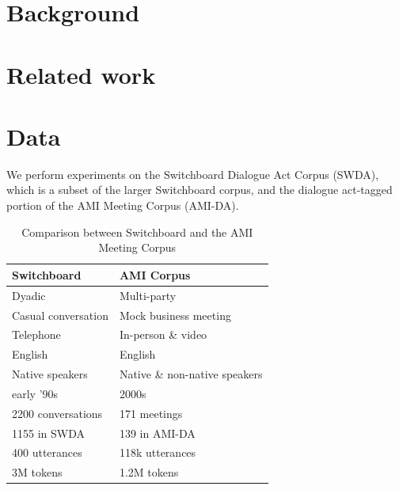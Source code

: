 \documentclass[11pt,a4paper]{article}
\begin{document}
\section{Background} %

\section{Related work} %

\section{Data}
We perform experiments on the Switchboard Dialogue Act Corpus (SWDA), which is a subset of the larger Switchboard corpus, and the dialogue act-tagged portion of the AMI Meeting Corpus (AMI-DA).


\begin{table}[]
\centering
\begin{tabular}{@{}ll@{}}
\toprule
\textbf{Switchboard}       & \textbf{AMI Corpus}                     \\ \midrule
Dyadic                     & Multi-party                             \\
Casual conversation        & Mock business meeting                   \\
Telephone                  & In-person \& video                      \\ \midrule
English                    & English                                 \\ 
Native speakers            & Native \& non-native speakers           \\ 
early '90s                 & 2000s                                   \\ \midrule
2200 conversations         & 171 meetings                            \\
  \hspace{1em} 1155 in SWDA               & \hspace{1em} 139 in AMI-DA                           \\
400 utterances             & 118k utterances                         \\
3M tokens                  & 1.2M tokens                             \\ \bottomrule
\end{tabular}
  \caption{Comparison between Switchboard and the AMI Meeting Corpus}
  \label{table:corpora}
\end{table}
\end{document}
